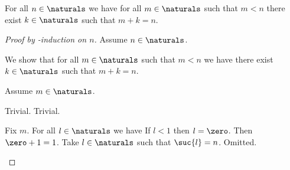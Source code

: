 \begin{proposition}\label{naturals_rless_existence_of_lesser_natural}
    For all $n \in \naturals$ we have for all $m \in \naturals$ such that $m < n$ there exist $k \in \naturals$ such that $m + k = n$.
\end{proposition}
\begin{proof}[Proof by \in-induction on $n$]
    Assume $n \in \naturals$.
    
    \begin{byCase}
            
            We show that for all $m \in \naturals$ such that $m < n$ we have there exist $k \in \naturals$ such that $m + k = n$.
            \begin{subproof}
                Assume $m \in \naturals$.
                \begin{byCase}
                        Trivial.
                        Trivial.
                \end{byCase}
            \end{subproof}
            Fix $m$.
            For all $l \in \naturals$ we have If $l < 1$ then $l = \zero$.
            Then $\zero + 1 = 1$.
            Take $l \in \naturals$ such that $\suc{l} = n$.
            Omitted.
    \end{byCase}
\end{proof}


